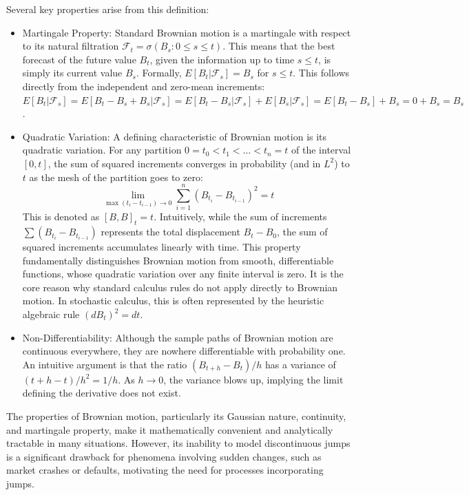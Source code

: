 \documentclass[11pt,twoside,openright]{report}
\begin{document}
Several key properties arise from this definition:
\begin{itemize}
    \item Martingale Property: Standard Brownian motion is a martingale with respect to its natural filtration $\mathcal{F}_t = \sigma(B_s : 0 \le s \le t)$. This means that the best forecast of the future value $B_t$, given the information up to time $s \le t$, is simply its current value $B_s$. Formally, $E[B_t | \mathcal{F}_s] = B_s$ for $s \le t$. This follows directly from the independent and zero-mean increments: $E[B_t | \mathcal{F}_s] = E[B_t - B_s + B_s | \mathcal{F}_s] = E[B_t - B_s | \mathcal{F}_s] + E[B_s | \mathcal{F}_s] = E[B_t - B_s] + B_s = 0 + B_s = B_s$.
    \item Quadratic Variation: A defining characteristic of Brownian motion is its quadratic variation. For any partition $0 = t_0 < t_1 < \dots < t_n = t$ of the interval $[0, t]$, the sum of squared increments converges in probability (and in $L^2$) to $t$ as the mesh of the partition goes to zero:
    \begin{equation}
    \lim_{\max(t_i - t_{i-1}) \to 0} \sum_{i=1}^n (B_{t_i} - B_{t_{i-1}})^2 = t
    \label{eq:quadratic_variation}
    \end{equation}
    This is denoted as $[B, B]_t = t$. Intuitively, while the sum of increments $\sum (B_{t_i} - B_{t_{i-1}})$ represents the total displacement $B_t - B_0$, the sum of squared increments accumulates linearly with time. This property fundamentally distinguishes Brownian motion from smooth, differentiable functions, whose quadratic variation over any finite interval is zero. It is the core reason why standard calculus rules do not apply directly to Brownian motion. In stochastic calculus, this is often represented by the heuristic algebraic rule $(dB_t)^2 = dt$.
    \item Non-Differentiability: Although the sample paths of Brownian motion are continuous everywhere, they are nowhere differentiable with probability one. An intuitive argument is that the ratio $(B_{t+h} - B_t)/h$ has a variance of $(t+h-t)/h^2 = 1/h$. As $h \to 0$, the variance blows up, implying the limit defining the derivative does not exist.
\end{itemize}
The properties of Brownian motion, particularly its Gaussian nature, continuity, and martingale property, make it mathematically convenient and analytically tractable in many situations. However, its inability to model discontinuous jumps is a significant drawback for phenomena involving sudden changes, such as market crashes or defaults, motivating the need for processes incorporating jumps.
\end{document}
